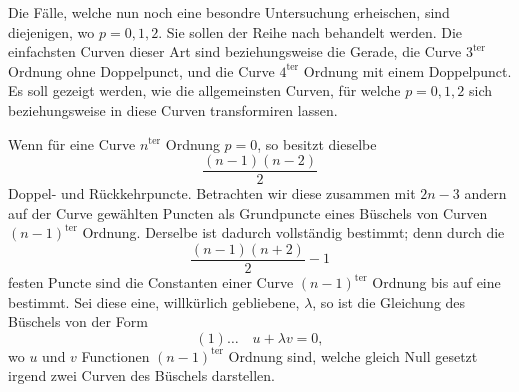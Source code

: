\documentclass[10pt]{article}
\begin{document}
Die Fälle, welche nun noch eine besondre Untersuchung erheischen, sind diejenigen, wo \(p=0,1,2\). Sie sollen der Reihe nach behandelt werden. Die einfachsten Curven dieser Art sind beziehungsweise die Gerade, die Curve \(3^{\text{ter}}\) Ordnung ohne Doppelpunct, und die Curve \(4^{\text{ter}}\) Ordnung mit einem Doppelpunct. Es soll gezeigt werden, wie die allgemeinsten Curven, für welche \(p=0,1,2\) sich beziehungsweise in diese Curven transformiren lassen.

Wenn für eine Curve \(n^{\text{ter}}\) Ordnung \(p=0\), so besitzt dieselbe
\[
\frac{(n-1)(n-2)}{2}
\]
Doppel- und Rückkehrpuncte. Betrachten wir diese zusammen mit \(2n-3\) andern auf der Curve gewählten Puncten als Grundpuncte eines Büschels von Curven \((n-1)^{\text{ter}}\) Ordnung. Derselbe ist dadurch vollständig bestimmt; denn durch die
\[
\frac{(n-1)(n+2)}{2}-1
\]
festen Puncte sind die Constanten einer Curve \((n-1)^{\text{ter}}\) Ordnung bis auf eine bestimmt. Sei diese eine, willkürlich gebliebene, \(\lambda\), so ist die Gleichung des Büschels von der Form
\[
(1)\ldots\quad u+\lambda v=0,
\]
wo \(u\) und \(v\) Functionen \((n-1)^{\text{ter}}\) Ordnung sind, welche gleich Null gesetzt irgend zwei Curven des Büschels darstellen.
\end{document}
